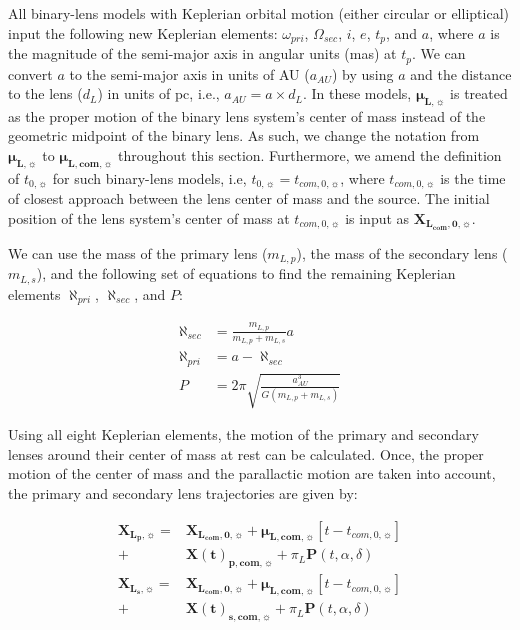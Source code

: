\documentclass[twocolumn]{aastex701}
\newcommand{\vect}[1]{\boldsymbol{#1}}
\newcommand{\tnot}{t_{0,\sun}}
\newcommand{\mulsysvec}{\vect{\mu}_{\boldsymbol{L, com},\sun}}
\newcommand{\mulvec}{\vect{\mu}_{\boldsymbol{L},\sun}}
\newcommand{\Xlcomvec}{\vect{X}_{\boldsymbol{L_{com},0},\sun}}
\newcommand{\Xlpvec}{\vect{X}_{\boldsymbol{L_p},\sun}}
\newcommand{\Xlsvec}{\vect{X}_{\boldsymbol{L_s},\sun}}
\newcommand{\Xcomp}{\vect{X(t)}_{\boldsymbol{p},\boldsymbol{com},\sun}}
\newcommand{\Xcoms}{\vect{X(t)}_{\boldsymbol{s},\boldsymbol{com},\sun}}
\newcommand{\tcomnot}{t_{com,0,\sun}}
\newcommand{\w}{\omega_{pri}}
\newcommand{\bigomega}{\Omega_{sec}}
\newcommand{\inclination}{\textit{i}}
\newcommand{\eccentricity}{\textit{e}}
\newcommand{\period}{\textit{P}}
\newcommand{\al}{\aleph_{pri}}
\newcommand{\ala}{\aleph_{sec}}
\begin{document}
All binary-lens models with Keplerian orbital motion (either circular or elliptical) input the following new Keplerian elements: $\w$, $\bigomega$, $\inclination$, $\eccentricity$, $t_p$, and $a$, where $a$ is the magnitude of the semi-major axis in angular units (mas) at $t_p$. We can convert $a$ to the semi-major axis in units of AU ($a_{AU}$) by using $a$ and the distance to the lens ($d_L$) in units of pc, i.e., $a_{AU} = a \times d_L$. In these models, $\mulvec$ is treated as the proper motion of the binary lens system's center of mass instead of the geometric midpoint of the binary lens. As such, we change the notation from $\mulvec$ to $\mulsysvec$ throughout this section. Furthermore, we amend the definition of $\tnot$ for such binary-lens models, i.e, $\tnot = \tcomnot$, where $\tcomnot$ is the time of closest approach between the lens center of mass and the source. The initial position of the lens system's center of mass at $\tcomnot$ is input as $\Xlcomvec$. 


We can use the mass of the primary lens ($m_{L,p}$), the mass of the secondary lens ($m_{L,s}$), and the following set of equations to find the remaining Keplerian elements $\al$,  $\ala$, and $\period$:

\begin{eqnarray*}
    \ala &= \frac{m_{L,p}}{m_{L,p}+m_{L,s}} a \nonumber \\
    \al &= a - \ala \nonumber \\
    \period &= 2 \pi \sqrt{\frac{a_{AU}^3}{G(m_{L,p} +m_{L,s})}}
\end{eqnarray*}

Using all eight Keplerian elements, the motion of the primary and secondary lenses around their center of mass at rest can be calculated. Once, the proper motion of the center of mass and the parallactic motion are taken into account, the primary and secondary lens trajectories are given by:

\begin{align}
    \Xlpvec =& \Xlcomvec + \mulsysvec [t - \tcomnot] \nonumber \\
    +& \Xcomp + \pi_L \vect{P}(t, \alpha, \delta) \\
    \Xlsvec =& \Xlcomvec + \mulsysvec [t - \tcomnot] \nonumber \\
    +& \Xcoms + \pi_L \vect{P}(t, \alpha, \delta) 
\end{align}
\end{document}
